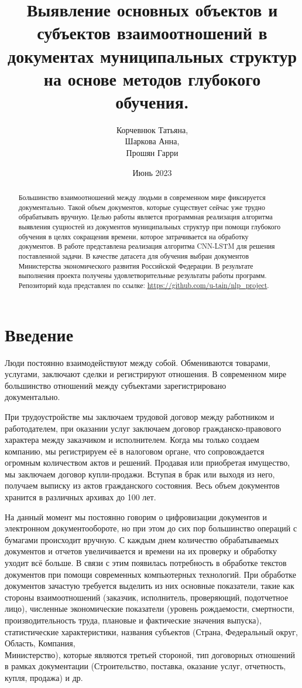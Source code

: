 \documentclass{article}
\title{Выявление основных объектов и субъектов взаимоотношений в документах муниципальных структур на основе методов глубокого обучения.}
\author{Корчевнюк Татьяна, \\
        Шаркова Анна,\\
        Прошян Гарри}
\date{Июнь 2023}
\begin{document}
\maketitle
\begin{abstract}
Большинство взаимоотношений между людьми в современном мире фиксируется документально. Такой объем документов, которые существует сейчас уже трудно обрабатывать вручную. Целью работы является программная реализация алгоритма выявления сущностей из документов муниципальных структур при помощи глубокого обучения в целях сокращения времени, которое затрачивается на обработку документов. В работе представлена реализация алгоритма  CNN-LSTM для решения поставленной задачи.  В качестве датасета для обучения выбран документов Министерства экономического развития Российской Федерации. В результате выполнения проекта получены удовлетворительные результаты работы программ. Репозиторий кода представлен по ссылке: \url{https://github.com/u-tain/nlp_project}.
\end{abstract}

\section{Введение}
Люди постоянно взаимодействуют между собой. Обмениваются товарами, услугами, заключают сделки и регистрируют отношения. В современном мире большинство отношений между субъектами зарегистрировано \\ документально.  

При трудоустройстве мы заключаем трудовой договор между работником и работодателем, при оказании услуг заключаем договор гражданско-правового характера между заказчиком и исполнителем. Когда мы только создаем компанию, мы регистрируем её в налоговом органе, что сопровождается огромным количеством актов и решений. Продавая или приобретая имущество, мы заключаем договор купли-продажи. Вступая в брак или выходя из него, получаем выписку из актов гражданского состояния.  Весь объем документов хранится в различных архивах до 100 лет. 

На данный момент мы постоянно говорим о цифровизации документов и электронном документообороте, но при этом до сих пор большинство операций с бумагами происходит вручную.  С каждым днем количество обрабатываемых документов и отчетов увеличивается и времени на их проверку и обработку уходит всё больше. 
В связи с этим появилась потребность в обработке текстов документов при помощи современных компьютерных технологий. При обработке документов зачастую требуется выделить из них основные показатели, такие как стороны взаимоотношений (заказчик, исполнитель, проверяющий, подотчетное лицо), численные экономические показатели (уровень рождаемости, смертности, производительность труда, плановые и фактические значения выпуска), статистические характеристики, названия субъектов (Страна, Федеральный округ, Область, Компания, \\ Министерство), которые являются третьей стороной, тип договорных отношений в рамках документации (Строительство, поставка, оказание услуг, отчетность, купля, продажа) и др. 
\end{document}
